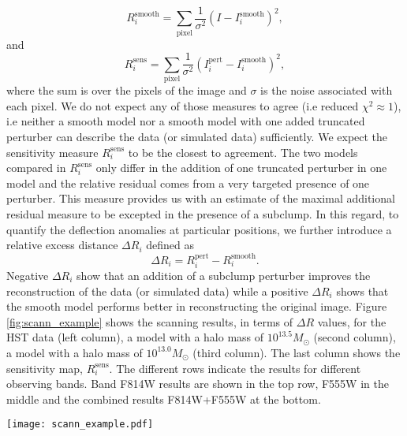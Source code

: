 \documentclass[a4paper,11pt]{article}
\begin{document}
\begin{equation}
	R^{\text{smooth}}_i = \sum_{\text{pixel}} \frac{1}{\sigma^2}\left(I -  I^{\text{smooth}}_i\right)^2,
\end{equation}
and
\begin{equation}
	R^{\text{sens}}_i = \sum_{\text{pixel}} \frac{1}{\sigma^2}\left(I^{\text{pert}}_i -  I^{\text{smooth}}_i\right)^2,
\end{equation}
where the sum is over the pixels of the image and $\sigma$ is the noise associated with each pixel. We do not expect any of those measures to agree (i.e reduced $\chi^2\approx 1$), i.e neither a smooth model nor a smooth model with one added truncated perturber can describe the data (or simulated data) sufficiently. We expect the sensitivity measure $R^{\text{sens}}_i$ to be the closest to agreement. The two models compared in $R^{\text{sens}}_i$ only differ in the addition of one truncated perturber in one model and the relative residual comes from a very targeted presence of one perturber. This measure provides us with an estimate of the maximal additional residual measure to be excepted in the presence of a subclump. In this regard, to quantify the deflection anomalies at particular positions,
we further introduce a relative excess distance $\Delta R_i$ defined as
\begin{equation} \label{eqn:relative_excess_dist}
	\Delta R_i = R^{\text{pert}}_i - R^{\text{smooth}}_i.
\end{equation}
Negative $\Delta R_i$ show that an addition of a subclump perturber improves the reconstruction of the data (or simulated data) while a positive $\Delta R_i$ shows that the smooth model performs better in reconstructing the original image. Figure \ref{fig:scann_example} shows the scanning results, in terms of $\Delta R$ values, for the HST data (left column), a model with a halo mass of $10^{13.5}M_{\odot}$ (second column), a model with a halo mass of $10^{13.0}M_{\odot}$ (third column). The last column shows the sensitivity map, $R^{\text{sens}}_i$. The different rows indicate the results for different observing bands. Band F814W results are shown in the top row, F555W in the middle and the combined results F814W+F555W at the bottom.

\begin{figure*}
  \centering
  \texttt{[image: scann\_example.pdf]}
  \caption{The scanning results for $\Delta R_i$ of the HST data (left column) and two selected CDM semi-analytic realizations with halo masses $10^{13.5}M_{\odot}$ and $10^{13}M_{\odot}$ (middle two columns) and the sensitivity map  (right column). The different rows indicate the analysis of observing band F814W (top), F555W (middle) and combined F814W+F555W (bottom). Each pixel in the plot reflects $\Delta D_i$ when placing the perturber at the position of the pixel.}
  \label{fig:scann_example}
\end{figure*}
\end{document}
